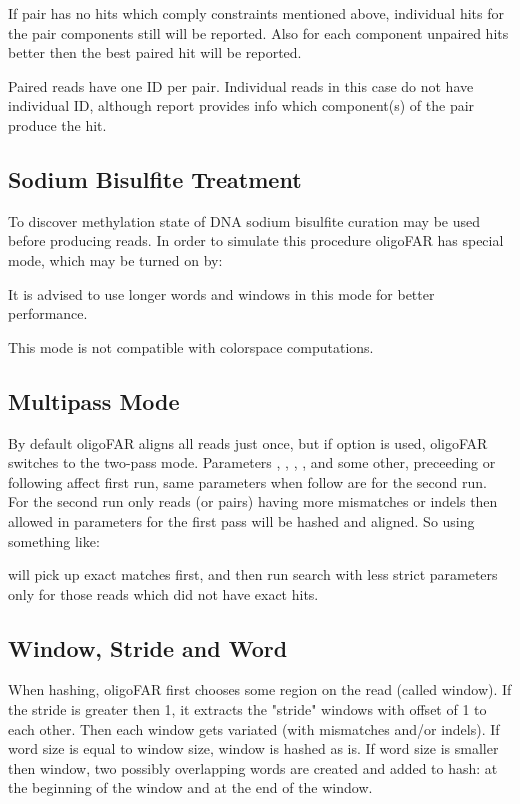 \documentclass[english]{article}
\begin{document}
    If pair has no hits which comply constraints mentioned above, individual 
    hits for the pair components still will be reported. Also for each
    component unpaired hits better then the best paired hit will be reported.

    Paired reads have one ID per pair. Individual reads in this case do not
    have individual ID, although report provides info which component(s) of 
    the pair produce the hit.

\subsection{Sodium Bisulfite Treatment}
    
	To discover methylation state of DNA sodium bisulfite curation may be
    used before producing reads.  In order to simulate this procedure
    oligoFAR has special mode, which may be turned on by:
    

    It is advised to use longer words and windows in this mode for better
    performance. 
    
    This mode is not compatible with colorspace computations.

\subsection{Multipass Mode}
   
   By default oligoFAR aligns all reads just once, but if option  is 
    used, oligoFAR switches to the two-pass mode. Parameters , , , , 
    and some other, preceeding  or following  affect first run, same 
    parameters when follow  are for the second run.  For the second run 
    only reads (or pairs) having more mismatches or indels then allowed in 
    parameters for the first pass will be hashed and aligned. So using something 
    like:

	         

    will pick up exact matches first, and then run search with less strict 
    parameters only for those reads which did not have exact hits.

\subsection{Window, Stride and Word}
    When hashing, oligoFAR first chooses some region on the read (called window).
    If the stride is greater then 1, it extracts the "stride" windows with offset 
    of 1 to each other. Then each window gets variated (with mismatches and/or 
    indels). If word size is equal to window size, window is hashed as is. If 
    word size is smaller then window, two possibly overlapping words are created
    and added to hash: at the beginning of the window and at the end of the 
    window.
\end{document}
